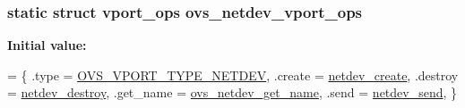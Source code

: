 \subsubsection[{ovs\+\_\+netdev\+\_\+vport\+\_\+ops}]{\setlength{\rightskip}{0pt plus 5cm}static struct {\bf vport\+\_\+ops} ovs\+\_\+netdev\+\_\+vport\+\_\+ops\hspace{0.3cm}{\ttfamily [static]}}\label{linux_2vport-netdev_8c_a881cb730847416574c9c4b3b7c4c3003}
{\bfseries Initial value\+:}
\begin{DoxyCode}
= \{
    .type       = \hyperlink{openvswitch_8h_a9a1b861aa99bd83177a2b10b34745b0aa825efa4a45bf501996d8d8fbb83887dd}{OVS\_VPORT\_TYPE\_NETDEV},
    .create     = \hyperlink{linux_2vport-netdev_8c_ae347c95fee1fc936f726d57cce0541f4}{netdev\_create},
    .destroy    = \hyperlink{linux_2vport-netdev_8c_a159283a11e7da94bc5e76ca2a2f6ceaa}{netdev\_destroy},
    .get\_name   = \hyperlink{linux_2vport-netdev_8c_a63439e8a15ca15f649e7cd4c26a79437}{ovs\_netdev\_get\_name},
    .send       = \hyperlink{linux_2vport-netdev_8c_a8fde99ce838cbc4e5b5f7c4ccaf07104}{netdev\_send},
\}
\end{DoxyCode}
